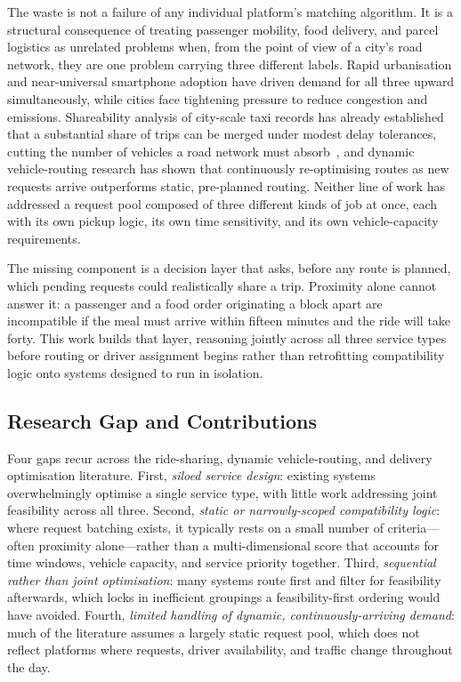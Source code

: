 \documentclass[conference]{IEEEtran}
\begin{document}
The waste is not a failure of any individual platform's matching algorithm. It
is a structural consequence of treating passenger mobility, food delivery, and
parcel logistics as unrelated problems when, from the point of view of a
city's road network, they are one problem carrying three different labels.
Rapid urbanisation and near-universal smartphone adoption have driven demand
for all three upward simultaneously, while cities face tightening pressure to
reduce congestion and emissions. Shareability analysis of city-scale taxi records has already established that
a substantial share of trips can be merged under modest delay tolerances,
cutting the number of vehicles a road network must absorb~\cite{santi2014},
and dynamic vehicle-routing research has shown that continuously re-optimising
routes as new requests arrive outperforms static, pre-planned routing. Neither line of work has
addressed a request pool composed of three different kinds of job at once,
each with its own pickup logic, its own time sensitivity, and its own
vehicle-capacity requirements.

The missing component is a decision layer that asks, before any route is
planned, which pending requests could realistically share a trip. Proximity
alone cannot answer it: a passenger and a food order originating a block apart
are incompatible if the meal must arrive within fifteen minutes and the ride
will take forty. This work builds that layer, reasoning jointly across all
three service types before routing or driver assignment begins rather than
retrofitting compatibility logic onto systems designed to run in isolation.

\subsection{Research Gap and Contributions}
Four gaps recur across the ride-sharing, dynamic vehicle-routing, and delivery
optimisation literature. First, \emph{siloed service design}: existing systems
overwhelmingly optimise a single service type, with little work addressing
joint feasibility across all three. Second, \emph{static or narrowly-scoped
compatibility logic}: where request batching exists, it typically rests on a
small number of criteria---often proximity alone---rather than a
multi-dimensional score that accounts for time windows, vehicle capacity, and
service priority together. Third, \emph{sequential rather than joint
optimisation}: many systems route first and filter for feasibility afterwards,
which locks in inefficient groupings a feasibility-first ordering would have
avoided. Fourth, \emph{limited handling of dynamic, continuously-arriving
demand}: much of the literature assumes a largely static request pool, which
does not reflect platforms where requests, driver availability, and traffic
change throughout the day.
\end{document}
